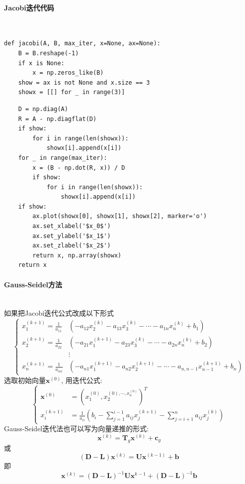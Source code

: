 \paragraph{Jacobi迭代代码}
~\\
\begin{verbatim}
def jacobi(A, B, max_iter, x=None, ax=None):
    B = B.reshape(-1)
    if x is None:
        x = np.zeros_like(B)
    show = ax is not None and x.size == 3
    showx = [[] for _ in range(3)]
\end{verbatim}
\begin{verbatim}
    D = np.diag(A)
    R = A - np.diagflat(D)
    if show:
        for i in range(len(showx)):
            showx[i].append(x[i])
    for _ in range(max_iter):
        x = (B - np.dot(R, x)) / D
        if show:
            for i in range(len(showx)):
                showx[i].append(x[i])
    if show:
        ax.plot(showx[0], showx[1], showx[2], marker='o')
        ax.set_xlabel('$x_0$')
        ax.set_ylabel('$x_1$')
        ax.set_zlabel('$x_2$')
        return x, np.array(showx)
    return x
\end{verbatim}

\paragraph{Gauss-Seidel方法}
~\\
如果把Jacobi迭代公式改成以下形式
$$\left\{
\begin{aligned}
x_1^{\left(k+1\right)} = \frac{1}{a_{11}}&\left(-a_{12}x_2^{\left(k\right)} -a_{13}x_3^{\left(k\right)} -\cdots - a_{1n}x_n^{\left(k\right)} +b_1\right) \\
x_2^{\left(k+1\right)} = \frac{1}{a_{22}}&\left(-a_{21}x_1^{\left(k+1\right)} -a_{23}x_3^{\left(k\right)} -\cdots - a_{2n}x_n^{\left(k\right)} +b_2\right) \\
&\vdots \\
x_n^{\left(k+1\right)} = \frac{1}{a_{nn}}&\left(-a_{n1}x_1^{\left(k+1\right)} -a_{n2}x_2^{\left(k+1\right)} -\cdots - a_{n,n-1}x_{n-1}^{\left(k+1\right)} +b_n\right) 
\end{aligned}
\right.$$
选取初始向量$\mathbf{x}^{\left(0\right)}$, 用迭代公式:
$$\left\{
\begin{aligned}
\mathbf{x}^{\left(0\right)} &= \left(x_1^{\left(0\right)},x_2^{\left(0\right),\cdots,x_n^{\left(0\right)}}\right)^T \\
x_i^{\left(k+1\right)} &= \frac{1}{a_{ii}}\left(b_i - \sum_{j=1}^{i-1}a_{ij}x_j^{\left(k+1\right)} - \sum_{j=i+1}^{n}a_{ij}x_j^{\left(k\right)} \right)
\end{aligned}
\right.$$
Gauss-Seidel迭代法也可以写为向量递推的形式:
$$\mathbf{x}^{\left(k\right)} = \mathbf{T}_g\mathbf{x}^{\left(k\right)} + \mathbf{c}_g$$
或
$$\left(\mathbf{D} - \mathbf{L}\right) \mathbf{x}^{\left(k\right)} = \mathbf{U} \mathbf{x}^{\left(k-1 \right)} + \mathbf{b}$$
即
$$ \mathbf{x}^{\left(k\right)} = \left(\mathbf{D} - \mathbf{L}\right)^{-1}\mathbf{U}\mathbf{x}^{k-1} + \left(\mathbf{D} - \mathbf{L}\right)^{-1}\mathbf{b}$$

